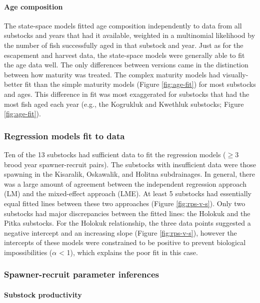 \documentclass[12pt,]{book}
\let\oldparagraph\paragraph
\renewcommand{\paragraph}[1]{\oldparagraph{#1}\mbox{}}
\theoremstyle{definition}
\theoremstyle{definition}
\theoremstyle{definition}
\theoremstyle{remark}
\begin{document}
\paragraph{Age composition}\label{age-data-fit}

\noindent
The state-space models fitted age composition independently to data from
all substocks and years that had it available, weighted in a multinomial
likelihood by the number of fish successfully aged in that substock and
year. Just as for the escapement and harvest data, the state-space
models were generally able to fit the age data well. The only
differences between versions came in the distinction between how
maturity was treated. The complex maturity models had visually-better
fit than the simple maturity models (Figure \ref{fig:age-fit}) for most
substocks and ages. This difference in fit was most exaggerated for
substocks that had the most fish aged each year (e.g., the Kogrukluk and
Kwethluk substocks; Figure \ref{fig:age-fit}).

\subsubsection{Regression models fit to data}\label{reg-fit}

\noindent
Ten of the 13 substocks had sufficient data to fit the regression models
(\(\ge 3\) brood year spawner-recruit pairs). The substocks with
insufficient data were those spawning in the Kisaralik, Oskawalik, and
Holitna subdrainages. In general, there was a large amount of agreement
between the independent regression approach (LM) and the mixed-effect
approach (LME). At least 5 substocks had essentially equal fitted lines
between these two approaches (Figure \ref{fig:rps-v-s}). Only two
substocks had major discrepancies between the fitted lines: the Holokuk
and the Pitka substocks. For the Holokuk relationship, the three data
points suggested a negative intercept and an increasing slope (Figure
\ref{fig:rps-v-s}), however the intercepts of these models were
constrained to be positive to prevent biological impossibilities
(\(\alpha\) \textless{} 1), which explains the poor fit in this case.

\subsubsection{Spawner-recruit parameter
inferences}\label{spawner-recruit-parameter-inferences}

\paragraph{Substock productivity}\label{substock-productivity}
\end{document}
